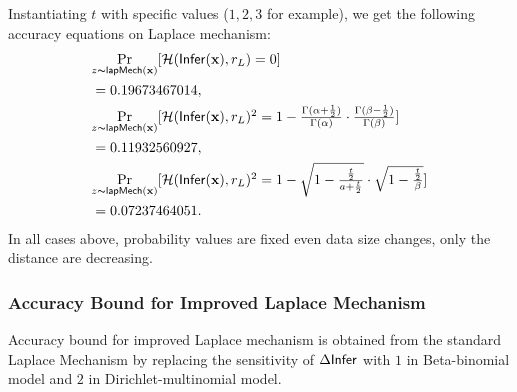 \documentclass{article}
\begin{document}
Instantiating $t$ with specific values ($1, 2, 3$ for example), we get the following accuracy equations on Laplace mechanism:
\begin{align*}
&\underset{z \thicksim \mathsf{lapMech}(\textbf{x})}{\Pr}[\textstyle\mathcal{H}(\mathsf{Infer}(\textbf{x}), r_L ) = 0]\\
&= 0.19673467014,\\
&\underset{z \thicksim \mathsf{lapMech}(\textbf{x})}{\Pr}[\textstyle\mathcal{H}(\mathsf{Infer}(\textbf{x}), r_L )^2 = 1 - \frac{\Gamma(\alpha+\frac{1}{2})}{\Gamma(\alpha)} \cdot
  \frac{\Gamma(\beta - \frac{1}{2})}{\Gamma(\beta)} ]\\ 
&= 0.11932560927,\\
&\underset{z \thicksim \mathsf{lapMech}(\textbf{x})}{\Pr}[\textstyle\mathcal{H}(\mathsf{Infer}(\textbf{x}), r_L )^2 = 1 - 
  \sqrt{1 - \frac{\frac{t}{2}}{a + \frac{t}{2}}}
  \cdot
  \sqrt{1 - \frac{\frac{t}{2}}{\beta}}] \\
&= 0.07237464051.
\end{align*}
In all cases above, probability values are fixed even data size changes, only the distance are decreasing.

\subsubsection{Accuracy Bound for Improved Laplace Mechanism}
\label{subsec_accuracy_lap}
Accuracy bound for improved Laplace mechanism is obtained from the standard Laplace Mechanism by replacing the sensitivity of $\Delta \mathsf{Infer}$ with $1$ in Beta-binomial model and $2$ in Dirichlet-multinomial model.
\end{document}
